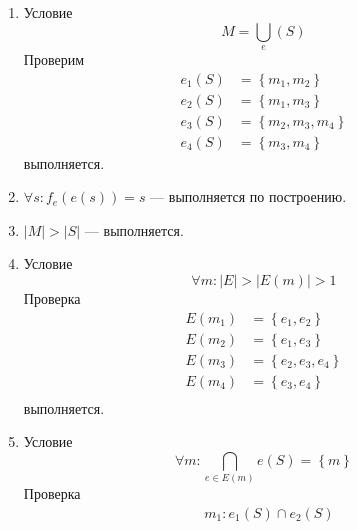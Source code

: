 \begin{example}
\begin{enumerate}
  \item
    Условие
    \begin{equation*}
      M=\bigcup\limits_{e}\left(S\right)
    \end{equation*}
    Проверим
    \begin{equation*}
      \begin{split}
        {e}_{1}\left(S\right)&=\left\{{m}_{1},{m}_{2}\right\} \\
        {e}_{2}\left(S\right)&=\left\{{m}_{1},{m}_{3}\right\} \\
        {e}_{3}\left(S\right)&=\left\{{m}_{2},{m}_{3},{m}_{4}\right\} \\
        {e}_{4}\left(S\right)&=\left\{{m}_{3},{m}_{4}\right\}
      \end{split}
    \end{equation*}
    выполняется.
  \item
    ${\forall}s:{f}_{e}\left(e\left(s\right)\right)=s$ --- выполняется
  по построению.
  \item
    $\left|M\right| > \left| S \right|$ --- выполняется.
  \item
    Условие
    \begin{equation*}
      {\forall}m:\left|E\right|>\left|E\left(m\right)\right|>1
    \end{equation*}
    Проверка
    \begin{equation*}
      \begin{split}
        E\left({m}_{1}\right)&=\left\{{e}_{1},{e}_{2}\right\} \\
        E\left({m}_{2}\right)&=\left\{{e}_{1},{e}_{3}\right\} \\
        E\left({m}_{3}\right)&=\left\{{e}_{2},{e}_{3},{e}_{4}\right\} \\
        E\left({m}_{4}\right)&=\left\{{e}_{3},{e}_{4}\right\} \\
      \end{split}
    \end{equation*}
    выполняется.
  \item
    Условие
    \begin{equation*}
      {\forall}m: \bigcap\limits_{e \in E\left( m \right)} e\left( S \right)
                  = \left\{m\right\}
    \end{equation*}
    Проверка
  \begin{equation*}
    \begin{split}
      &{m}_{1}:{e}_{1}\left(S\right) \cap {e}_{2}\left(S\right)

\end{split}
\end{equation*}
\end{enumerate}
\end{example}
